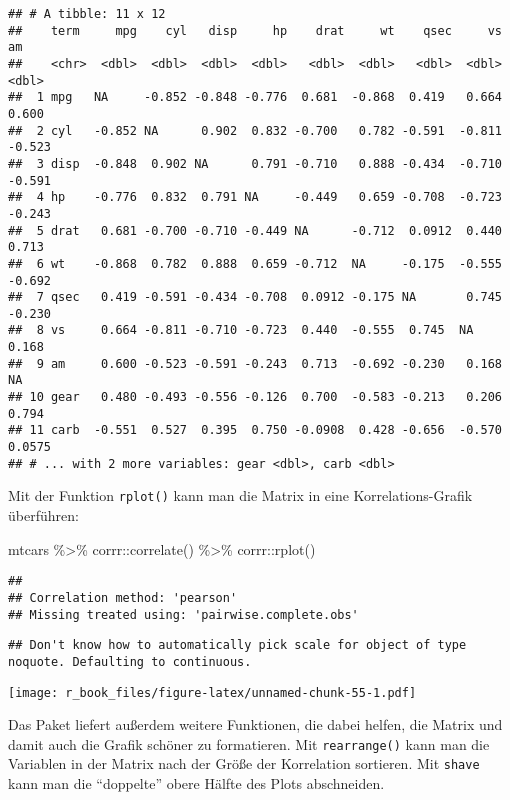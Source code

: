 \documentclass[
]{book}
\newenvironment{Shaded}{\begin{snugshade}}{\end{snugshade}}
\newcommand{\FunctionTok}[1]{\textcolor[rgb]{0.00,0.00,0.00}{#1}}
\newcommand{\NormalTok}[1]{#1}
\newcommand{\SpecialCharTok}[1]{\textcolor[rgb]{0.00,0.00,0.00}{#1}}
\begin{document}
\begin{verbatim}
## # A tibble: 11 x 12
##    term     mpg    cyl   disp     hp    drat     wt    qsec     vs      am
##    <chr>  <dbl>  <dbl>  <dbl>  <dbl>   <dbl>  <dbl>   <dbl>  <dbl>   <dbl>
##  1 mpg   NA     -0.852 -0.848 -0.776  0.681  -0.868  0.419   0.664  0.600 
##  2 cyl   -0.852 NA      0.902  0.832 -0.700   0.782 -0.591  -0.811 -0.523 
##  3 disp  -0.848  0.902 NA      0.791 -0.710   0.888 -0.434  -0.710 -0.591 
##  4 hp    -0.776  0.832  0.791 NA     -0.449   0.659 -0.708  -0.723 -0.243 
##  5 drat   0.681 -0.700 -0.710 -0.449 NA      -0.712  0.0912  0.440  0.713 
##  6 wt    -0.868  0.782  0.888  0.659 -0.712  NA     -0.175  -0.555 -0.692 
##  7 qsec   0.419 -0.591 -0.434 -0.708  0.0912 -0.175 NA       0.745 -0.230 
##  8 vs     0.664 -0.811 -0.710 -0.723  0.440  -0.555  0.745  NA      0.168 
##  9 am     0.600 -0.523 -0.591 -0.243  0.713  -0.692 -0.230   0.168 NA     
## 10 gear   0.480 -0.493 -0.556 -0.126  0.700  -0.583 -0.213   0.206  0.794 
## 11 carb  -0.551  0.527  0.395  0.750 -0.0908  0.428 -0.656  -0.570  0.0575
## # ... with 2 more variables: gear <dbl>, carb <dbl>
\end{verbatim}

Mit der Funktion \texttt{rplot()} kann man die Matrix in eine Korrelations-Grafik überführen:

\begin{Shaded}
\begin{Highlighting}[]
\NormalTok{mtcars }\SpecialCharTok{\%\textgreater{}\%} 
\NormalTok{  corrr}\SpecialCharTok{::}\FunctionTok{correlate}\NormalTok{() }\SpecialCharTok{\%\textgreater{}\%}
\NormalTok{  corrr}\SpecialCharTok{::}\FunctionTok{rplot}\NormalTok{()}
\end{Highlighting}
\end{Shaded}

\begin{verbatim}
## 
## Correlation method: 'pearson'
## Missing treated using: 'pairwise.complete.obs'
\end{verbatim}

\begin{verbatim}
## Don't know how to automatically pick scale for object of type noquote. Defaulting to continuous.
\end{verbatim}

\texttt{[image: r\_book\_files/figure-latex/unnamed-chunk-55-1.pdf]}

Das Paket liefert außerdem weitere Funktionen, die dabei helfen, die Matrix und damit auch die Grafik schöner zu formatieren. Mit \texttt{rearrange()} kann man die Variablen in der Matrix nach der Größe der Korrelation sortieren. Mit \texttt{shave} kann man die ``doppelte'' obere Hälfte des Plots abschneiden.
\end{document}
